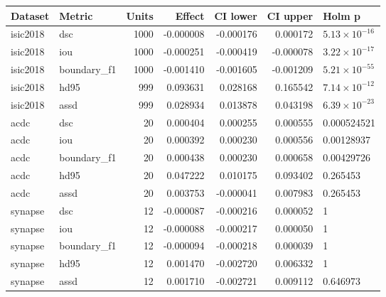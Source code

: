 \begin{tabular}{llrrrrl}
Dataset & Metric & Units & Effect & CI lower & CI upper & Holm p \\
\hline
isic2018 & dsc & 1000 & -0.000008 & -0.000176 & 0.000172 & $5.13\times 10^{-16}$ \\
isic2018 & iou & 1000 & -0.000251 & -0.000419 & -0.000078 & $3.22\times 10^{-17}$ \\
isic2018 & boundary\_f1 & 1000 & -0.001410 & -0.001605 & -0.001209 & $5.21\times 10^{-55}$ \\
isic2018 & hd95 & 999 & 0.093631 & 0.028168 & 0.165542 & $7.14\times 10^{-12}$ \\
isic2018 & assd & 999 & 0.028934 & 0.013878 & 0.043198 & $6.39\times 10^{-23}$ \\
acdc & dsc & 20 & 0.000404 & 0.000255 & 0.000555 & 0.000524521 \\
acdc & iou & 20 & 0.000392 & 0.000230 & 0.000556 & 0.00128937 \\
acdc & boundary\_f1 & 20 & 0.000438 & 0.000230 & 0.000658 & 0.00429726 \\
acdc & hd95 & 20 & 0.047222 & 0.010175 & 0.093402 & 0.265453 \\
acdc & assd & 20 & 0.003753 & -0.000041 & 0.007983 & 0.265453 \\
synapse & dsc & 12 & -0.000087 & -0.000216 & 0.000052 & 1 \\
synapse & iou & 12 & -0.000088 & -0.000217 & 0.000050 & 1 \\
synapse & boundary\_f1 & 12 & -0.000094 & -0.000218 & 0.000039 & 1 \\
synapse & hd95 & 12 & 0.001470 & -0.002720 & 0.006332 & 1 \\
synapse & assd & 12 & 0.001710 & -0.002721 & 0.009112 & 0.646973 \\
\end{tabular}
